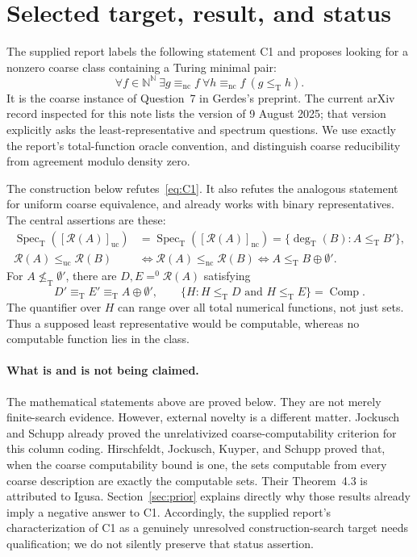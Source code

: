 \documentclass[11pt,a4paper]{article}
\newcommand{\N}{\mathbb N}
\newcommand{\Baire}{\N^{\N}}
\newcommand{\leT}{\leq_{\mathrm T}}
\newcommand{\eqT}{\equiv_{\mathrm T}}
\newcommand{\nleT}{\nleq_{\mathrm T}}
\newcommand{\leuc}{\leq_{\mathrm{uc}}}
\newcommand{\lenc}{\leq_{\mathrm{nc}}}
\newcommand{\eqnc}{\equiv_{\mathrm{nc}}}
\newcommand{\az}{\mathrel{=^{0}}}
\newcommand{\Spec}{\operatorname{Spec}_{\mathrm T}}
\newcommand{\degT}{\operatorname{deg}_{\mathrm T}}
\newcommand{\R}{\mathcal R}
\newcommand{\Comp}{\operatorname{Comp}}
\theoremstyle{definition}\newtheorem{definition}[theorem]{Definition}
\theoremstyle{remark}\newtheorem{remark}[theorem]{Remark}
\begin{document}
\section{Selected target, result, and status}
\label{sec:target}
The supplied report labels the following statement C1 and proposes looking for a nonzero coarse class containing a Turing minimal pair:\cite{Unified}
\begin{equation}
 \forall f\in\Baire\ \exists g\eqnc f\ \forall h\eqnc f\ (g\leT h).
 \tag{C1}\label{eq:C1}
\end{equation}
It is the coarse instance of Question~7 in Gerdes's preprint. The current arXiv record inspected for this note lists the version of 9 August 2025; that version explicitly asks the least-representative and spectrum questions.\cite{Gerdes} We use exactly the report's total-function oracle convention, and distinguish coarse reducibility from agreement modulo density zero.

The construction below refutes~\eqref{eq:C1}. It also refutes the analogous statement for uniform coarse equivalence, and already works with binary representatives. The central assertions are these:
\begin{align}
 \Spec([\R(A)]_{\mathrm{uc}})
 &=\Spec([\R(A)]_{\mathrm{nc}})
 =\{\degT(B):A\leT B'\},\label{eq:overview-spectrum}\\
 \R(A)\leuc\R(B)
 &\Longleftrightarrow \R(A)\lenc\R(B)
 \Longleftrightarrow A\leT B\oplus\emptyset'.\label{eq:overview-order}
\end{align}
For $A\nleT\emptyset'$, there are $D,E\az\R(A)$ satisfying
\begin{equation}
 D'\eqT E'\eqT A\oplus\emptyset',\qquad
 \{H:H\leT D\text{ and }H\leT E\}=\Comp.
 \label{eq:overview-pair}
\end{equation}
The quantifier over $H$ can range over all total numerical functions, not just sets. Thus a supposed least representative would be computable, whereas no computable function lies in the class.

\paragraph{What is and is not being claimed.}
The mathematical statements above are proved below. They are not merely finite-search evidence. However, external novelty is a different matter. Jockusch and Schupp already proved the unrelativized coarse-computability criterion for this column coding.\cite[Theorem~2.19]{JS} Hirschfeldt, Jockusch, Kuyper, and Schupp proved that, when the coarse computability bound is one, the sets computable from every coarse description are exactly the computable sets. Their Theorem~4.3 is attributed to Igusa.\cite{HJKS} Section~\ref{sec:prior} explains directly why those results already imply a negative answer to C1. Accordingly, the supplied report's characterization of C1 as a genuinely unresolved construction-search target needs qualification; we do not silently preserve that status assertion.
\end{document}
